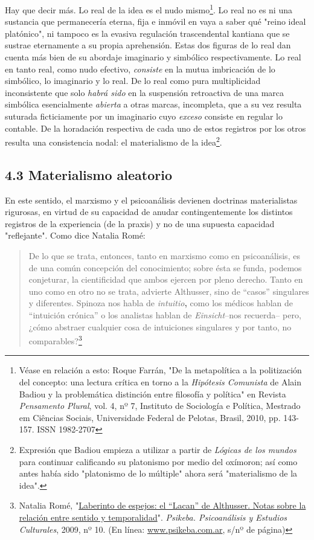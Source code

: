 Hay que decir más. Lo real de la idea es el nudo mismo\footnote{Véase en
  relación a esto: Roque Farrán, "De la metapolítica a la politización
  del concepto: una lectura crítica en torno a la \emph{Hipótesis
  Comunista} de Alain Badiou y la problemática distinción entre
  filosofía y política" en Revista \emph{Pensamento Plural}, vol. 4, nº
  7, Instituto de Sociología e Política, Mestrado em Ciências Sociais,
  Universidade Federal de Pelotas, Brasil, 2010, pp. 143-157. ISSN
  1982-2707}. Lo real no es ni una sustancia que permanecería eterna,
fija e inmóvil en vaya a saber qué "reino ideal platónico", ni tampoco
es la evasiva regulación trascendental kantiana que se sustrae
eternamente a su propia aprehensión. Estas dos figuras de lo real dan
cuenta más bien de su abordaje imaginario y simbólico respectivamente.
Lo real en tanto real, como nudo efectivo, \emph{consiste} en la mutua
imbricación de lo simbólico, lo imaginario y lo real. De lo real como
pura multiplicidad inconsistente que solo \emph{habrá sido} en la
suspensión retroactiva de una marca simbólica esencialmente
\emph{abierta} a otras marcas, incompleta, que a su vez resulta suturada
ficticiamente por un imaginario cuyo \emph{exceso} consiste en regular
lo contable. De la horadación respectiva de cada uno de estos registros
por los otros resulta una consistencia nodal: el materialismo de la
idea\footnote{Expresión que Badiou empieza a utilizar a partir de
  \emph{Lógicas de los mundos} para continuar calificando su platonismo
  por medio del oxímoron; así como antes había sido "platonismo de lo
  múltiple" ahora será "materialismo de la idea".}.

\subsection{4.3 Materialismo aleatorio}

En este sentido, el marxismo y el psicoanálisis devienen doctrinas
materialistas rigurosas, en virtud de su capacidad de anudar
contingentemente los distintos registros de la experiencia (de la
praxis) y no de una supuesta capacidad "reflejante". Como dice Natalia
Romé:

\begin{quote}
De lo que se trata, entonces, tanto en marxismo como en psicoanálisis,
es de una común concepción del conocimiento; sobre ésta se funda,
podemos conjeturar, la cientificidad que ambos ejercen por pleno
derecho. Tanto en uno como en otro no se trata, advierte Althusser, sino
de ``casos'' singulares y diferentes. Spinoza nos habla de
\emph{intuitio}\textbf{,} como los médicos hablan de ``intuición
crónica'' o los analistas hablan de \emph{Einsicht}--nos recuerda--
pero, ¿cómo abstraer cualquier cosa de intuiciones singulares y por
tanto, no comparables?\footnote{Natalia Romé,
  "\href{http://www.psikeba.com.ar/articulos2/NR_el_Lacan_de_Althusser.htm}{Laberinto
  de espejos: el ``Lacan'' de Althusser. Notas sobre la relación entre
  sentido y temporalidad}". \emph{Psikeba. Psicoanálisis y Estudios
  Culturales}, 2009, nº 10. (En línea:
  \href{http://www.psikeba.com.ar/}{www.psikeba.com.ar}, s/nº de página)}
\end{quote}

